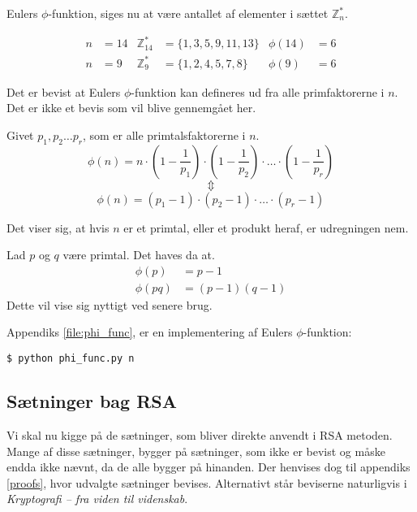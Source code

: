 \begin{definition}
    Eulers \(\phi\)-funktion, siges nu at være antallet af elementer i sættet \(\mathbb{Z}_n^*\).
\end{definition}

\begin{eks}
    \mbox{}\vspace*{-1.5em}
    \begin{align*}
        n &= 14 & \mathbb{Z}_{14}^*  &= \{1, 3, 5, 9, 11, 13 \} & \phi(14) &= 6\\
        n &= 9  & \mathbb{Z}_9^*     &= \{1, 2, 4, 5, 7, 8\}    & \phi(9)  &= 6
    \end{align*}
\end{eks}

Det er bevist at Eulers \(\phi\)-funktion kan defineres ud fra alle primfaktorerne i \(n\).
Det er ikke et bevis som vil blive gennemgået her.

\begin{sent}
    Givet \(p_1, p_2 \hdots p_r\), som er alle primtalsfaktorerne i \(n\).
    \[\phi(n) = n \cdot \left(1-\frac{1}{p_1}\right) \cdot \left(1-\frac{1}{p_2}\right) \cdot \hdots \cdot \left(1-\frac{1}{p_r}\right)\]
    \[\Updownarrow\]
    \[\phi(n) = (p_1 - 1) \cdot (p_2 - 1) \cdot \hdots \cdot (p_r - 1)\]
\end{sent}

Det viser sig, at hvis \(n\) er et primtal, eller et produkt heraf, er udregningen nem.

\begin{eks}
    Lad \(p\) og \(q\) være primtal. Det haves da at.
    \begin{align}
        \phi(p)   &= p - 1\\
        \phi(p q) &= (p - 1)(q - 1)
    \end{align}
    Dette vil vise sig nyttigt ved senere brug.
\end{eks}

Appendiks \ref{file:phi_func}, er en implementering af Eulers \(\phi\)-funktion:
\begin{verbatim}
$ python phi_func.py n
\end{verbatim}




\subsection{Sætninger bag RSA}
Vi skal nu kigge på de sætninger, som bliver direkte anvendt i RSA metoden.
Mange af disse sætninger, bygger på sætninger, som ikke er bevist og måske endda ikke nævnt, da de alle bygger på hinanden.
Der henvises dog til appendiks \ref{proofs}, hvor udvalgte sætninger bevises.
Alternativt står beviserne naturligvis i \textit{Kryptografi -- fra viden til videnskab}. \cite{krypto}

